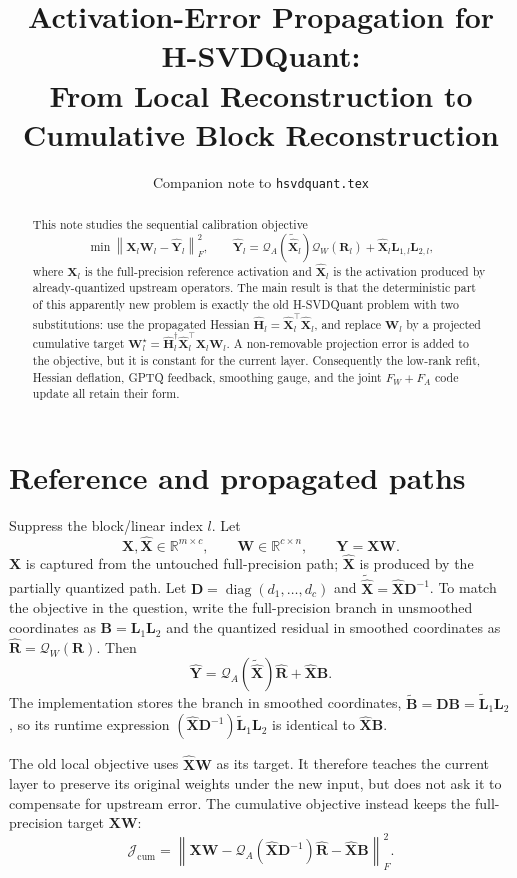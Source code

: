 \documentclass[11pt]{article}
\title{\bf Activation-Error Propagation for H-SVDQuant:\\
From Local Reconstruction to Cumulative Block Reconstruction}
\author{Companion note to \texttt{hsvdquant.tex}}
\date{}
\newcommand{\R}{\mathbb{R}}
\newcommand{\X}{\bm X}
\newcommand{\Xh}{\widehat{\bm X}}
\newcommand{\W}{\bm W}
\newcommand{\Y}{\bm Y}
\newcommand{\D}{\bm D}
\newcommand{\B}{\bm B}
\newcommand{\Rr}{\bm R}
\newcommand{\Rh}{\widehat{\bm R}}
\newcommand{\Hh}{\widehat{\bm H}}
\newcommand{\Qa}{\mathcal Q_A}
\newcommand{\Qw}{\mathcal Q_W}
\begin{document}
\maketitle

\begin{abstract}
This note studies the sequential calibration objective
\[
  \min\left\|\X_l\W_l-\widehat{\Y}_l\right\|_F^2,
  \qquad
  \widehat{\Y}_l=
  \Qa(\widetilde{\Xh}_l)\Qw(\Rr_l)+\Xh_l\bm L_{1,l}\bm L_{2,l},
\]
where $\X_l$ is the full-precision reference activation and $\Xh_l$ is the
activation produced by already-quantized upstream operators.  The main result
is that the deterministic part of this apparently new problem is exactly the
old H-SVDQuant problem with two substitutions: use the propagated Hessian
$\Hh_l=\Xh_l^\top\Xh_l$, and replace $\W_l$ by a projected cumulative target
$\W_l^\star=\Hh_l^\dagger\Xh_l^\top\X_l\W_l$.  A non-removable projection
error is added to the objective, but it is constant for the current layer.
Consequently the low-rank refit, Hessian deflation, GPTQ feedback, smoothing
gauge, and the joint $F_W+F_A$ code update all retain their form.
\end{abstract}

\section{Reference and propagated paths}

Suppress the block/linear index $l$.  Let
\[
  \X,\Xh\in\R^{m\times c},\qquad \W\in\R^{c\times n},
  \qquad \Y=\X\W.
\]
$\X$ is captured from the untouched full-precision path; $\Xh$ is produced by
the partially quantized path.  Let $\D=\operatorname{diag}(d_1,\ldots,d_c)$ and
$\widetilde{\Xh}=\Xh\D^{-1}$.  To match the objective in the question, write
the full-precision branch in unsmoothed coordinates as
$\B=\bm L_1\bm L_2$ and the quantized residual in smoothed coordinates as
$\Rh=\Qw(\Rr)$.  Then
\begin{equation}\label{eq:deploy}
  \widehat{\Y}
  =\Qa(\widetilde{\Xh})\Rh+\Xh\B.
\end{equation}
The implementation stores the branch in smoothed coordinates,
$\widetilde{\B}=\D\B=\widetilde{\bm L}_1\bm L_2$, so its runtime expression
$(\Xh\D^{-1})\widetilde{\bm L}_1\bm L_2$ is identical to $\Xh\B$.

The old local objective uses $\Xh\W$ as its target.  It therefore teaches the
current layer to preserve its original weights under the new input, but does
not ask it to compensate for upstream error.  The cumulative objective instead
keeps the full-precision target $\X\W$:
\begin{equation}\label{eq:cumulative}
  \mathcal J_{\mathrm{cum}}
  =\left\|\X\W-\Qa(\Xh\D^{-1})\Rh-\Xh\B\right\|_F^2.
\end{equation}
\end{document}
